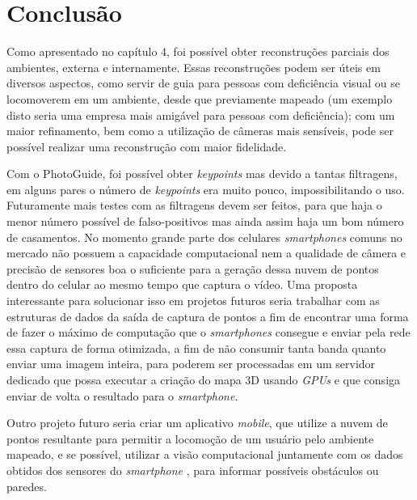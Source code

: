 \chapter{Conclusão}

Como apresentado no capítulo 4, foi possível obter reconstruções parciais dos ambientes, externa e internamente. Essas reconstruções podem ser úteis em diversos aspectos, como servir de guia para pessoas com deficiência visual ou se locomoverem em um ambiente, desde que previamente mapeado (um exemplo disto seria uma empresa mais amigável para pessoas com deficiência); com um maior refinamento, bem como a utilização de câmeras mais sensíveis, pode ser possível realizar uma reconstrução com maior fidelidade. 

	 Com o PhotoGuide, foi possível obter \textit{keypoints} mas devido a tantas filtragens, em alguns pares o número de \textit{keypoints} era muito pouco, impossibilitando o uso. Futuramente mais testes com as filtragens devem ser feitos, para que haja o menor número possível de falso-positivos mas ainda assim haja um bom número de casamentos. No momento grande parte dos celulares \textit{smartphones} comuns no mercado não possuem a capacidade computacional nem a qualidade de câmera e precisão de sensores boa o suficiente para a geração dessa nuvem de pontos dentro do celular ao mesmo tempo que captura o vídeo. Uma proposta interessante para solucionar isso em projetos futuros seria trabalhar com as estruturas de dados da saída de captura de pontos a fim de encontrar uma forma de fazer o máximo de computação que o \textit{smartphones} consegue e enviar pela rede essa captura de forma otimizada, a fim de não consumir tanta banda quanto enviar uma imagem inteira, para poderem ser processadas em um servidor dedicado que possa executar a criação do mapa 3D usando \textit{GPUs} e que consiga enviar de volta o resultado para o \textit{smartphone}.
	

Outro projeto futuro seria criar um aplicativo \textit{mobile}, que utilize a nuvem de pontos resultante para permitir a locomoção de um usuário pelo ambiente mapeado, e se possível, utilizar a visão computacional juntamente com os dados obtidos dos sensores do \textit{smartphone} , para informar possíveis obstáculos ou paredes.
